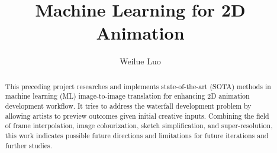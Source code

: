
\title{Machine Learning for 2D Animation}
\author{Weilue Luo}

\maketitle
\makedeclaration

\begin{abstract} %
This preceding project researches and implements state-of-the-art (SOTA) methods in machine learning (ML) image-to-image translation for enhancing 2D animation development workflow. It tries to address the waterfall development problem by allowing artists to preview outcomes given initial creative inputs. Combining the field of frame interpolation, image colourization, sketch simplification, and super-resolution, this work indicates possible future directions and limitations for future iterations and further studies.
\end{abstract}



